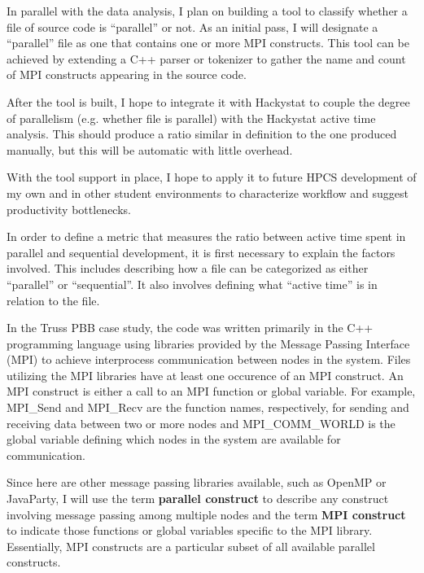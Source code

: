 \documentclass[11pt,twocolumn]{article}
\begin{document}
In parallel with the data analysis, I plan on building a tool to
classify whether a file of source code is ``parallel'' or not.  As an
initial pass, I will designate a ``parallel'' file as one that
contains one or more MPI constructs.  This tool can be achieved by
extending a C++ parser or tokenizer to gather the name and count of
MPI constructs appearing in the source code.

After the tool is built, I hope to integrate it with Hackystat to
couple the degree of parallelism (e.g. whether file is parallel) with
the Hackystat active time analysis.  This should produce a ratio
similar in definition to the one produced manually, but this will be
automatic with little overhead.

With the tool support in place, I hope to apply it to future HPCS
development of my own and in other student environments to
characterize workflow and suggest productivity bottlenecks.

\label{sec:dopatmetric}
In order to define a metric that measures the ratio between active
time spent in parallel and sequential development, it is first
necessary to explain the factors involved.  This includes describing
how a file can be categorized as either ``parallel'' or
``sequential''.  It also involves defining what ``active time'' is in
relation to the file.

In the Truss PBB case study, the code was written primarily in the C++
programming language using libraries provided by the Message Passing
Interface\cite{MPISite} (MPI) to achieve interprocess communication
between nodes in the system.  Files utilizing the MPI libraries have
at least one occurence of an MPI construct.  An MPI construct is
either a call to an MPI function or global variable.  For example,
MPI\_Send and MPI\_Recv are the function names, respectively, for
sending and receiving data between two or more nodes and
MPI\_COMM\_WORLD is the global variable defining which nodes in the
system are available for communication.  

Since here are other message passing libraries available, such as
OpenMP\cite{OpenMPSite} or JavaParty\cite{JavaPartySite}, I will use
the term {\bf parallel construct} to describe any construct involving
message passing among multiple nodes and the term {\bf MPI construct}
to indicate those functions or global variables specific to the MPI
library.  Essentially, MPI constructs are a particular subset of all
available parallel constructs.
\end{document}
